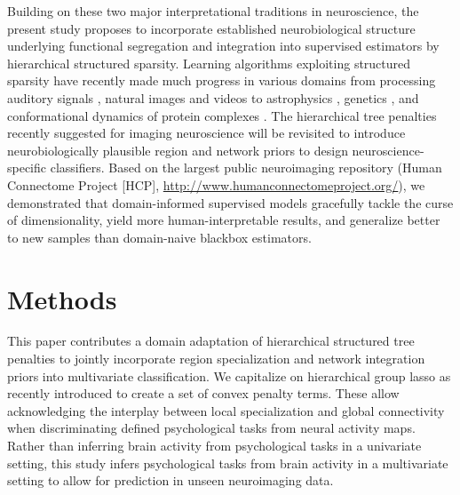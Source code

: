 \documentclass{article}
\begin{document}
Building on these two major interpretational traditions in neuroscience,
the present study proposes to incorporate
established neurobiological structure underlying
functional segregation and integration
into supervised estimators
by hierarchical structured sparsity.
%
Learning algorithms
exploiting structured sparsity 
have recently made much progress in various domains
from processing auditory signals \cite{daudet2004sparse},
natural images \cite{harzallah2009combining} and
videos \cite{kang2015structured}
to
astrophysics \cite{vinci2014estimating},
genetics \cite{kim2012tree},
and
conformational dynamics of protein complexes \cite{jenatton2009structured}.
%
The hierarchical tree penalties recently suggested for imaging neuroscience
\cite{jenatton2011multi} will be revisited to
introduce neurobiologically plausible region and network priors
to design neuroscience-specific classifiers.
%
Based on the largest public neuroimaging repository
(Human Connectome Project [HCP], \url{http://www.humanconnectomeproject.org/}),
we demonstrated that domain-informed supervised models
gracefully tackle the curse of dimensionality,
yield more human-interpretable results,
and generalize better to new samples
than domain-naive blackbox estimators.

\section{Methods}
This paper contributes a domain adaptation of hierarchical structured
tree penalties to jointly incorporate region 
specialization and network integration priors into multivariate 
classification.
We capitalize on hierarchical group lasso as recently introduced
\cite{jenatton2011multi} to create a set of convex penalty terms.
These allow acknowledging the interplay between local specialization and 
global connectivity when discriminating defined psychological tasks
from neural activity maps.
Rather than inferring brain activity from psychological tasks
in a univariate setting,
this study infers psychological tasks from brain activity
in a multivariate setting to allow for
prediction in unseen neuroimaging data.
%
\end{document}
